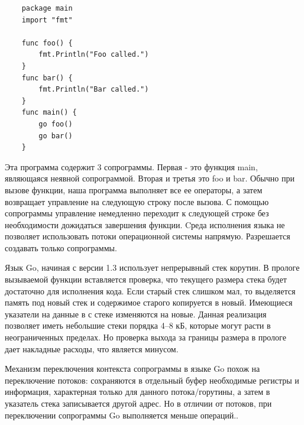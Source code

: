 	\begin{lstlisting}
	package main
	import "fmt"
	
	func foo() {
		fmt.Println("Foo called.")
	}
	func bar() {
		fmt.Println("Bar called.")
	}
	func main() {
		go foo()
		go bar()
	}

	\end{lstlisting}
		
	Эта программа содержит 3 сопрограммы. Первая - это функция main, являющаяся
	неявной сопрограммой. Вторая и третья это foo и bar. Обычно при вызове функции, наша программа 
	выполняет все ее операторы, а затем возвращает управление на следующую строку после вызова. 
	С помощью сопрограммы управление немедленно переходит к следующей строке без необходимости дожидаться завершения функции. Cреда исполнения языка не позволяет использовать потоки операционной системы
	напрямую. Разрешается создавать только сопрограммы.
	\par
	Язык Go, начиная с версии 1.3 использует непрерывный стек корутин. В прологе вызываемой функции вставляется проверка,
	что текущего размера стека будет достаточно для исполнения кода. Если старый стек слишком мал,
	то выделяется память под новый стек и содержимое старого копируется в новый. Имеющиеся указатели на
	данные в с стеке изменяются на новые. Данная реализация позволяет иметь небольшие стеки порядка 4--8 кБ, которые
	могут расти в неограниченных пределах. Но проверка выхода за границы размера в прологе дает накладные расходы,
	что является минусом. 
	\par 
	Механизм переключения контекста сопрограммы в языке Go похож на переключение потоков:
	сохраняются в отдельный буфер необходимые регистры и информация, характерная только для данного
	потока/горутины, а затем в указатель стека записывается другой адрес. Но в отличии от потоков, 
	при переключении сопрограммы Go выполняется меньше операций.\cite{go-context}.
	\clearpage
	
